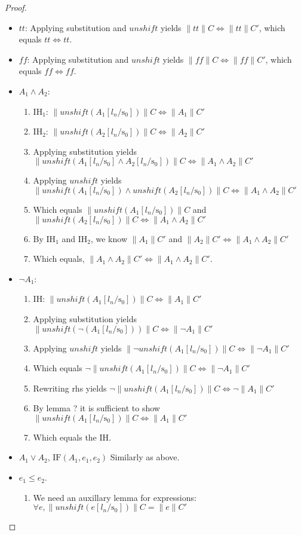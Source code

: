 \documentclass[a4paper,11pt]{article}
\newcommand{\UNSHIFT}{\mathit{unshift}}
\newcommand{\Stack}{\mathrm{s}}
\newcommand{\TRUE}{\mathit{tt}}
\newcommand{\FALSE}{\mathit{ff}}
\newcommand{\IF}{\mathrm{IF}}
\begin{document}
\begin{proof}
\begin{itemize}
  \begin{itemize}
  \item $\TRUE$: Applying substitution and $\UNSHIFT$ yields $\|\TRUE\|C \Leftrightarrow \| \TRUE \| C'$, which equals $\TRUE \Leftrightarrow \TRUE$.
  \item $\FALSE$: Applying substitution and $\UNSHIFT$ yields $\|\FALSE\|C \Leftrightarrow \| \FALSE \| C'$, which equals $\FALSE \Leftrightarrow \FALSE$.
  \item $A_1 \land A_2$:
    \begin{enumerate}
    \item IH$_1$: $ \| \UNSHIFT(A_1[l_n/\Stack_0]) \| C \Leftrightarrow \| A_1 \| C'$
    \item IH$_2$: $ \| \UNSHIFT(A_2[l_n/\Stack_0]) \| C \Leftrightarrow \| A_2 \| C'$
    \item Applying substitution yields $\| \UNSHIFT(A_1[l_n/\Stack_0] \land A_2[l_n/\Stack_0]) \| C \Leftrightarrow \| A_1 \land A_2 \| C'$
    \item Applying $\UNSHIFT$ yields $\| \UNSHIFT(A_1[l_n/\Stack_0]) \land \UNSHIFT(A_2[l_n/\Stack_0]) \| C \Leftrightarrow \| A_1 \land A_2 \| C'$
    \item Which equals $ \| \UNSHIFT(A_1[l_n/\Stack_0]) \| C$ and $\| \UNSHIFT(A_2[l_n/\Stack_0]) \| C \Leftrightarrow \| A_1 \land A_2 \| C'$
    \item By IH$_1$ and IH$_2$, we know $ \| A_1 \| C'$ and $\| A_2 \| C' \Leftrightarrow \| A_1 \land A_2 \| C'$
    \item Which equals, $\| A_1 \land A_2 \| C' \Leftrightarrow \| A_1 \land A_2 \| C'$.
    \end{enumerate}
  \item $\neg A_1$:
    \begin{enumerate}
    \item IH: $ \| \UNSHIFT(A_1[l_n/\Stack_0]) \| C \Leftrightarrow \| A_1 \| C'$
    \item Applying substitution yields $ \| \UNSHIFT(\neg (A_1[l_n/\Stack_0])) \| C \Leftrightarrow \| \neg A_1 \| C'$
    \item Applying $\UNSHIFT$ yields $ \| \neg \UNSHIFT(A_1[l_n/\Stack_0]) \| C \Leftrightarrow \| \neg A_1 \| C'$
    \item Which equals $ \neg \| \UNSHIFT(A_1[l_n/\Stack_0]) \| C \Leftrightarrow \| \neg A_1 \| C'$
    \item Rewriting rhs yields $ \neg \| \UNSHIFT(A_1[l_n/\Stack_0]) \| C \Leftrightarrow \neg \| A_1 \| C'$
    \item By lemma ? it is sufficient to show $\| \UNSHIFT(A_1[l_n/\Stack_0]) \| C \Leftrightarrow \| A_1 \| C'$
    \item Which equals the IH.
    \end{enumerate}
  \item $A_1 \lor A_2$, $\IF(A_1, e_1, e_2)$ Similarly as above.
  \item $e_1 \leq e_2$.
    \begin{enumerate}
    \item We need an auxillary lemma for expressions: $\forall e, \| \UNSHIFT(e[l_n/\Stack_0]) \| C = \| e \| C' $
      

\end{enumerate}
\end{itemize}
\end{itemize}
\end{proof}
\end{document}
